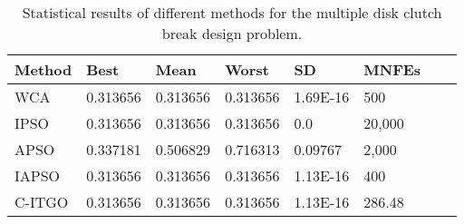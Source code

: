 
\begin{table*}[tp]
    \tiny
    \begin{center}
    
    \begin{tabular}{ P{2.0cm} P{2.0cm} P{2.0cm} P{2.0cm} P{2.0cm} P{2.0cm} P{2.0cm} P{2.0cm}  }
    \hline
    \textbf{Method} & \textbf{Best} & \textbf{Mean} & \textbf{Worst} & \textbf{SD} & \textbf{MNFEs} \\
    \hline

    WCA & 0.313656 & 0.313656 & 0.313656 & 1.69E-16 & 500 \\
    IPSO & 0.313656 & 0.313656 & 0.313656 & 0.0 & 20,000 \\
    APSO & 0.337181 & 0.506829 & 0.716313 & 0.09767 & 2,000 \\    
    IAPSO & 0.313656 & 0.313656 & 0.313656 & 1.13E-16 & 400 \\
    C-ITGO & 0.313656 & 0.313656 & 0.313656 & 1.13E-16 & 286.48 \\

    \hline
    \end{tabular}
    \end{center}
    
    \caption{ Statistical results of different methods for the multiple disk clutch break design problem. \\[1em]}
    \label{tab:MD}
    \end{table*}
    
    